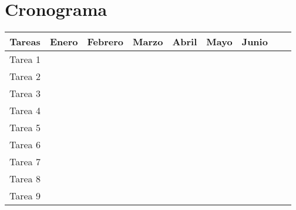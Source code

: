 \documentclass[11pt, spanish, letterpage]{article} %
\begin{document}
\section{Cronograma} %
\begin{center}
	\begingroup
	\setlength{\tabcolsep}{10pt} %
	\renewcommand{\arraystretch}{1.2} %
        \begin{tabular}{|c|c|c|c|c|c|c|c|c|}
                \hline
                \textbf{Tareas} & \textbf{Enero} & \textbf{Febrero} & \textbf{Marzo} & \textbf{Abril} & \textbf{Mayo} & \textbf{Junio} \\ \hline
                Tarea 1 & \cellcolor[gray]{0.5} &  &  &  &  &	\\ \hline
                Tarea 2 & \cellcolor[gray]{0.5} & & & & &	\\ \hline
                Tarea 3 & \cellcolor[gray]{0.5} & & & & &	\\ \hline
                Tarea 4 & & \cellcolor[gray]{0.5} & & & &	\\ \hline
                Tarea 5 & & \cellcolor[gray]{0.5} & & & &	\\ \hline
                Tarea 6 & & & \cellcolor[gray]{0.5} & & &	\\ \hline
                Tarea 7 & & & \cellcolor[gray]{0.5} & & &	\\ \hline
                Tarea 8 & & & \cellcolor[gray]{0.5} & \cellcolor[gray]{0.5} & \cellcolor[gray]{0.5} &	\\ \hline
				Tarea 9 & & & & & & \cellcolor[gray]{0.5}	\\ \hline
        \end{tabular}
    \endgroup
\end{center}
\end{document}
